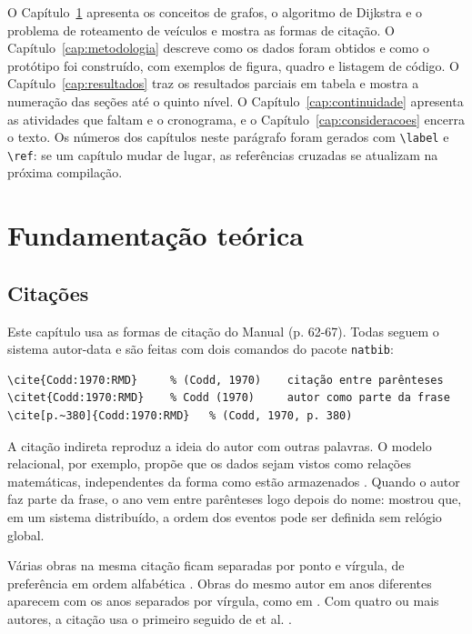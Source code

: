 \documentclass[eq,capa]{texufpel}
\begin{document}
O Capítulo~\ref{cap:fundamentacao} apresenta os conceitos de grafos, o
algoritmo de Dijkstra e o problema de roteamento de veículos e mostra as
formas de citação. O Capítulo~\ref{cap:metodologia} descreve como os dados
foram obtidos e como o protótipo foi construído, com exemplos de figura,
quadro e listagem de código. O Capítulo~\ref{cap:resultados} traz os
resultados parciais em tabela e mostra a numeração das seções até o quinto
nível. O Capítulo~\ref{cap:continuidade} apresenta as atividades que faltam e
o cronograma, e o Capítulo~\ref{cap:consideracoes} encerra o texto. Os números
dos capítulos neste parágrafo foram gerados com \verb|\label| e \verb|\ref|:
se um capítulo mudar de lugar, as referências cruzadas se atualizam na
próxima compilação.

\chapter{Fundamentação teórica}
\label{cap:fundamentacao}

\section{Citações}
\label{sec:citacoes}

Este capítulo usa as formas de citação do Manual (p. 62-67). Todas seguem o
sistema autor-data e são feitas com dois comandos do pacote \texttt{natbib}:

\begin{lstlisting}[language={[LaTeX]TeX}, numbers=none]
\cite{Codd:1970:RMD}     % (Codd, 1970)    citação entre parênteses
\citet{Codd:1970:RMD}    % Codd (1970)     autor como parte da frase
\cite[p.~380]{Codd:1970:RMD}   % (Codd, 1970, p. 380)
\end{lstlisting}

A citação indireta reproduz a ideia do autor com outras palavras. O modelo
relacional, por exemplo, propõe que os dados sejam vistos como relações
matemáticas, independentes da forma como estão armazenados
\citep{Codd:1970:RMD}. Quando o autor faz parte da frase, o ano vem entre
parênteses logo depois do nome: \citet{Lamport:1978:TCO} mostrou que, em um
sistema distribuído, a ordem dos eventos pode ser definida sem relógio
global.

Várias obras na mesma citação ficam separadas por ponto e vírgula, de
preferência em ordem alfabética \citep{Hoare:1969:ABC,Lamport:1978:TCO}.
Obras do mesmo autor em anos diferentes aparecem com os anos separados por
vírgula, como em \citet{Turing:1937:OCN,Turing:1950:CMI}. Com quatro ou mais
autores, a citação usa o primeiro seguido de et al. \citep{Cormen:2022:IA}.
\end{document}
